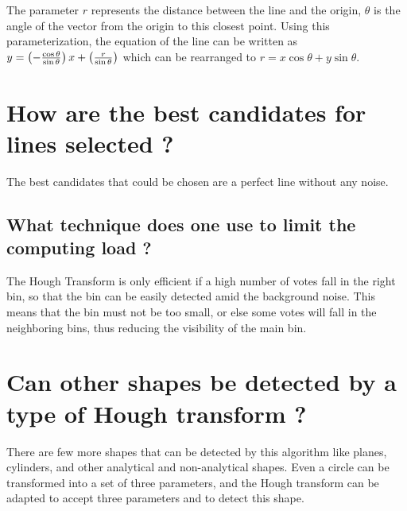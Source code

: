 \documentclass[twoside]{article}
\begin{document}
The parameter $r$ represents the distance between the line and the origin, $\theta$ is the angle of the vector from the origin to this closest point. 
Using this parameterization, the equation of the line can be written as $y = \left(-{\cos\theta\over\sin\theta}\right)x + \left({r\over{\sin\theta}}\right)$ which can be rearranged to $r = x \cos \theta+y\sin \theta$.

\section{How are the best candidates for lines selected ? }
The best candidates that could be chosen are a perfect line without any noise.

\subsection{What technique does one use to limit the computing load ?}
The Hough Transform is only efficient if a high number of votes fall in the right bin, so that the bin can be easily detected amid the background noise. 
This means that the bin must not be too small, or else some votes will fall in the neighboring bins, thus reducing the visibility of the main bin.

\section{Can other shapes be detected by a type of Hough transform ?}
There are few more shapes that can be detected by this algorithm like planes, cylinders, and other analytical and non-analytical shapes.
Even a circle can be transformed into a set of three parameters, and the Hough transform can be adapted to accept three parameters and to detect this shape.
\end{document}
